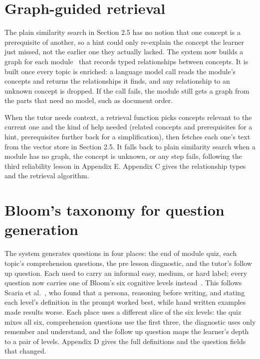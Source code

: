 \documentclass{ecai}
\begin{document}
\section{Graph-guided retrieval}

The plain similarity search in Section 2.5 has no notion that one concept is a
prerequisite of another, so a hint could only re-explain the concept the learner
just missed, not the earlier one they actually lacked. The system now builds a
graph for each module~\cite{hogan2021knowledge} that records typed relationships
between concepts. It is built once every topic is enriched: a language model call
reads the module's concepts and returns the relationships it finds, and any
relationship to an unknown concept is dropped. If the call fails, the module
still gets a graph from the parts that need no model, such as document order.

When the tutor needs context, a retrieval function picks concepts relevant to the
current one and the kind of help needed (related concepts and prerequisites for a
hint, prerequisites further back for a simplification), then fetches each one's
text from the vector store in Section 2.5. It falls back to plain similarity
search when a module has no graph, the concept is unknown, or any step fails,
following the third reliability lesson in Appendix E. Appendix C gives the
relationship types and the retrieval algorithm.

\section{Bloom's taxonomy for question generation}

The system generates questions in four places: the end of module quiz, each
topic's comprehension questions, the pre lesson diagnostic, and the tutor's
follow up question. Each used to carry an informal easy, medium, or hard label;
every question now carries one of Bloom's six cognitive levels
instead~\cite{anderson2001taxonomy}. This follows Scaria et
al.~\cite{scaria2024bloom}, who found that a persona, reasoning before writing,
and stating each level's definition in the prompt worked best, while hand written
examples made results worse. Each place uses a different slice of the six levels:
the quiz mixes all six, comprehension questions use the first three, the
diagnostic uses only remember and understand, and the follow up question maps the
learner's depth to a pair of levels. Appendix D gives the full definitions and the
question fields that changed.
\end{document}
